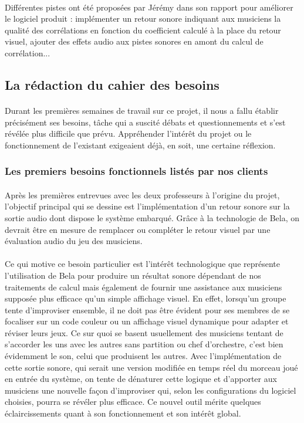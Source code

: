 \paragraph{}
Différentes pistes ont été proposées par Jérémy dans son rapport pour
améliorer le logiciel produit : implémenter un retour sonore indiquant
aux musiciens la qualité des corrélations en fonction du coefficient
calculé à la place du retour visuel, ajouter des effets audio aux
pistes sonores en amont du calcul de corrélation...

\subsection{La rédaction du cahier des besoins}

\paragraph{}
Durant les premières semaines de travail sur ce projet, il nous a
fallu établir précisément ses besoins, tâche qui a suscité débats et
questionnements et s'est révélée plus difficile que prévu. Appréhender
l'intérêt du projet ou le fonctionnement de l'existant exigeaient
déjà, en soit, une certaine réflexion.

\subsubsection{Les premiers besoins fonctionnels listés par nos clients}
\paragraph{}
Après les premières entrevues avec les deux professeurs à l'origine du
projet, l'objectif principal qui se dessine est l'implémentation d'un
retour sonore sur la sortie audio dont dispose le système
embarqué. Grâce à la technologie de Bela, on devrait être en mesure de
remplacer ou compléter le retour visuel par une évaluation audio du
jeu des musiciens.
\paragraph{}
Ce qui motive ce besoin particulier est l'intérêt technologique que
représente l'utilisation de Bela pour produire un résultat sonore
dépendant de nos traitements de calcul mais également de fournir une
assistance aux musiciens supposée plus efficace qu'un simple affichage
visuel. En effet, lorsqu'un groupe tente d'improviser ensemble, il ne
doit pas être évident pour ses membres de se focaliser sur un code
couleur ou un affichage visuel dynamique pour adapter et réviser leurs
jeux. Ce sur quoi se basent usuellement des musiciens tentant de
s'accorder les uns avec les autres sans partition ou chef d'orchestre,
c'est bien évidemment le son, celui que produisent les autres. Avec
l'implémentation de cette sortie sonore, qui serait une version
modifiée en temps réel du morceau joué en entrée du système, on tente
de dénaturer cette logique et d'apporter aux musiciens une nouvelle
façon d'improviser qui, selon les configurations du logiciel choisies,
pourra se révéler plus efficace. Ce nouvel outil mérite quelques
éclaircissements quant à son fonctionnement et son intérêt global.
